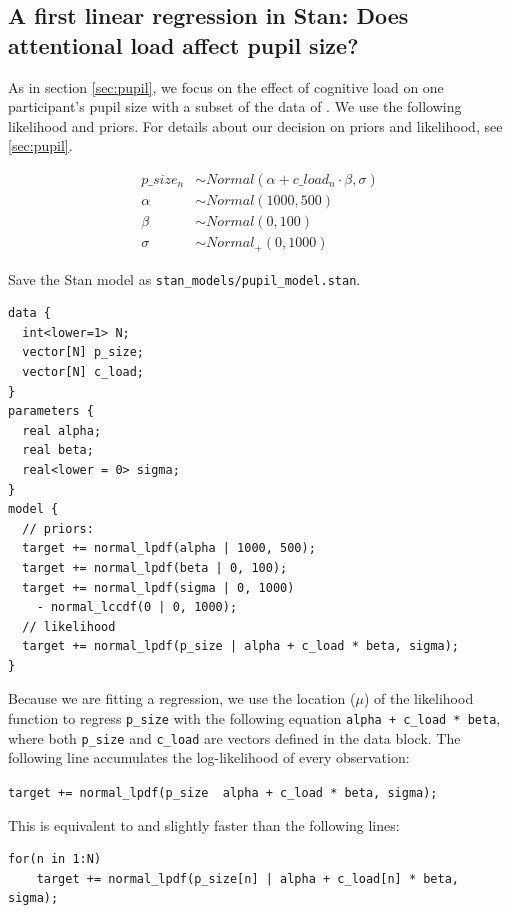 \documentclass[12pt,]{krantz}
\theoremstyle{definition}
\theoremstyle{definition}
\theoremstyle{definition}
\theoremstyle{remark}
\begin{document}
\hypertarget{sec:pupilstan}{%
\subsection{A first linear regression in Stan: Does attentional load affect pupil size?}\label{sec:pupilstan}}

As in section \ref{sec:pupil}, we focus on the effect of cognitive load on one participant's pupil size with a subset of the data of \citet{wahnPupilSizesScale2016}. We use the following likelihood and priors. For details about our decision on priors and likelihood, see \ref{sec:pupil}.

\begin{equation}
\begin{aligned}
p\_size_n &\sim Normal(\alpha + c\_load_n \cdot \beta,\sigma) \\
\alpha &\sim Normal(1000, 500) \\
\beta &\sim Normal(0, 100) \\
\sigma &\sim Normal_+(0, 1000)
\end{aligned}
\end{equation}

Save the Stan model as \texttt{stan\_models/pupil\_model.stan}.

\begin{verbatim}
data {
  int<lower=1> N;
  vector[N] p_size;
  vector[N] c_load;
}
parameters {
  real alpha;
  real beta;
  real<lower = 0> sigma;
}
model {
  // priors:
  target += normal_lpdf(alpha | 1000, 500);
  target += normal_lpdf(beta | 0, 100);
  target += normal_lpdf(sigma | 0, 1000)
    - normal_lccdf(0 | 0, 1000);
  // likelihood
  target += normal_lpdf(p_size | alpha + c_load * beta, sigma);
}
\end{verbatim}

Because we are fitting a regression, we use the location (\(\mu\)) of the likelihood function to regress \texttt{p\_size} with the following equation \texttt{alpha\ +\ c\_load\ *\ beta}, where both \texttt{p\_size} and \texttt{c\_load} are vectors defined in the data block. The following line accumulates the log-likelihood of every observation:

\texttt{target\ +=\ normal\_lpdf(p\_size\ \textbar{}\ alpha\ +\ c\_load\ *\ beta,\ sigma);}

This is equivalent to and slightly faster than the following lines:

\begin{verbatim}
for(n in 1:N)
    target += normal_lpdf(p_size[n] | alpha + c_load[n] * beta, sigma);
\end{verbatim}
\end{document}
